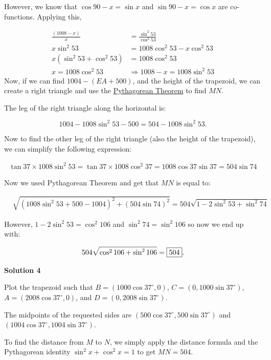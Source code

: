 \begin{enumerate}
 However, we know that $\cos{90-x} = \sin{x}$ and $\sin{90-x} = \cos{x}$ are co-functions. Applying this,

 
 \begin{align*}\frac{(1008-x)}{x} &= \frac{\sin^2{53}}{\cos^2{53}} \\ x\sin^2{53} &= 1008\cos^2{53} - x\cos^2{53}\\ x(\sin^2{53}  + \cos^2{53}) &= 1008\cos^2{53}\\ x = 1008\cos^2{53} &\Longrightarrow 1008-x = 1008\sin^2{53} \end{align*}
Now, if we can find $1004 - (EA + 500)$, and the height of the trapezoid, we can create a right triangle and use the \href{https://artofproblemsolving.com/wiki/index.php?title=Pythagorean\_Theorem}{Pythagorean Theorem} to find $MN$. 

 The leg of the right triangle along the horizontal is:

 
 \[1004 - 1008\sin^2{53} - 500 = 504 - 1008\sin^2{53}.\]

 Now to find the other leg of the right triangle (also the height of the trapezoid), we can simplify the following expression:

 
 \begin{align*}\tan{37} \times 1008 \sin^2{53} = \tan{37} \times 1008 \cos^2{37} = 1008\cos{37}\sin{37} = 504\sin74\end{align*}


 Now we used Pythagorean Theorem and get that $MN$ is equal to:

 
 \begin{align*}&\sqrt{(1008\sin^2{53} + 500 -1004)^2 + (504\sin{74})^2} = 504\sqrt{1-2\sin^2{53} + \sin^2{74}} \end{align*}


 However, $1-2\sin^2{53} = \cos^2{106}$ and $\sin^2{74} = \sin^2{106}$ so now we end up with:

 
 \[504\sqrt{\cos^2{106} + \sin^2{106}} =\fbox{504}.\]




\textbf{Solution 4}

Plot the trapezoid such that $B=\left(1000\cos 37^\circ, 0\right)$, $C=\left(0, 1000\sin 37^\circ\right)$, $A=\left(2008\cos 37^\circ, 0\right)$, and $D=\left(0, 2008\sin 37^\circ\right)$.

 The midpoints of the requested sides are $\left(500\cos 37^\circ, 500\sin 37^\circ\right)$ and $\left(1004\cos 37^\circ, 1004\sin 37^\circ\right)$.

 To find the distance from $M$ to $N$, we simply apply the distance formula and the Pythagorean identity $\sin^2 x + \cos^2 x = 1$ to get $MN=\boxed{504}$.


\end{enumerate}
